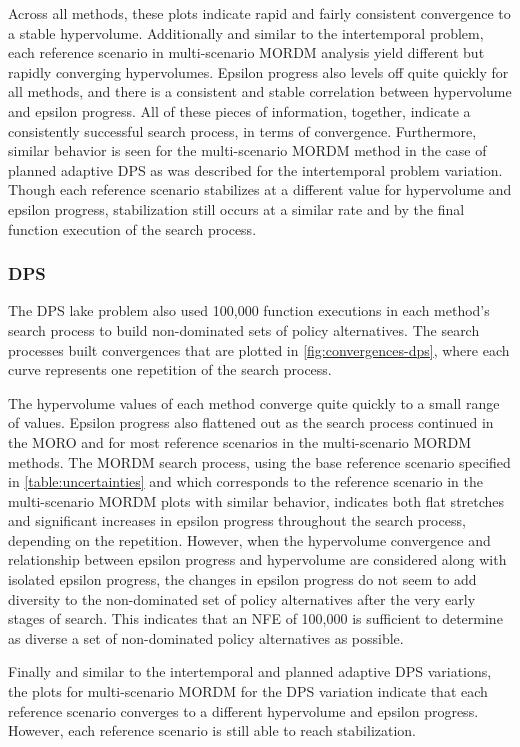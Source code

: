         Across all methods, these plots indicate rapid and fairly consistent convergence to a stable hypervolume. Additionally and similar to the intertemporal problem, each reference scenario in multi-scenario MORDM analysis yield different but rapidly converging hypervolumes. Epsilon progress also levels off quite quickly for all methods, and there is a consistent and stable correlation between hypervolume and epsilon progress. All of these pieces of information, together, indicate a consistently successful search process, in terms of convergence. Furthermore, similar behavior is seen for the multi-scenario MORDM method in the case of planned adaptive DPS as was described for the intertemporal problem variation. Though each reference scenario stabilizes at a different value for hypervolume and epsilon progress, stabilization still occurs at a similar rate and by the final function execution of the search process. 

        \subsubsection{DPS}
        The DPS lake problem also used 100,000 function executions in each method's search process to build non-dominated sets of policy alternatives. The search processes built convergences that are plotted in \cref{fig:convergences-dps}, where each curve represents one repetition of the search process. 
        
        The hypervolume values of each method converge quite quickly to a small range of values. Epsilon progress also flattened out as the search process continued in the MORO and for most reference scenarios in the multi-scenario MORDM methods. The MORDM search process, using the base reference scenario specified in \cref{table:uncertainties} and which corresponds to the reference scenario in the multi-scenario MORDM plots with similar behavior, indicates both flat stretches and significant increases in epsilon progress throughout the search process, depending on the repetition. However, when the hypervolume convergence and relationship between epsilon progress and hypervolume are considered along with isolated epsilon progress, the changes in epsilon progress do not seem to add diversity to the non-dominated set of policy alternatives after the very early stages of search. This indicates that an NFE of 100,000 is sufficient to determine as diverse a set of non-dominated policy alternatives as possible. 
        
        Finally and similar to the intertemporal and planned adaptive DPS variations, the plots for multi-scenario MORDM for the DPS variation indicate that each reference scenario converges to a different hypervolume and epsilon progress. However, each reference scenario is still able to reach stabilization. 
        
